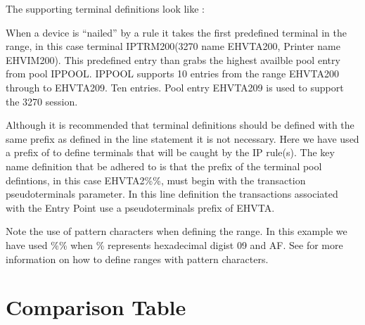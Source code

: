 \documentclass[letterpaper,10pt,english]{sphinxmanual}
\begin{document}
\sphinxAtStartPar
The supporting terminal definitions look like :\sphinxhyphen{}

\sphinxAtStartPar
{}

\sphinxAtStartPar
When a device is “nailed” by a rule it takes the first predefined terminal in the range, in this case terminal IPTRM200(3270 name EHVTA200, Printer name EHVIM200). This pre\sphinxhyphen{}defined entry than grabs the highest availble pool entry from pool IPPOOL. IPPOOL supports 10 entries from the range EHVTA200 through to EHVTA209. Ten entries. Pool entry EHVTA209 is used to support the 3270 session.

\sphinxAtStartPar
Although it is recommended that terminal definitions should be defined with the same prefix as defined in the line statement it is not necessary. Here we have used a prefix of  to define terminals that will be caught by the IP rule(s). The key name definition that  be adhered to is that the prefix of the terminal pool defintions, in this case EHVTA2\%\%, must begin with the transaction pseudo\sphinxhyphen{}terminals parameter. In this line definition the transactions associated with the Entry Point use a pseudo\sphinxhyphen{}terminals prefix of EHVTA.

\sphinxAtStartPar
Note the use of pattern characters when defining the range. In this example we have used \%\% when \% represents hexadecimal digist 0\sphinxhyphen{}9 and A\sphinxhyphen{}F. See {\hyperref[\detokenize{connectivity_guide:v461cn-patterncharacters}]{}} for more information on how to define ranges with pattern characters.

\sphinxAtStartPar
{}

\newpage

\ignorespaces 

\section{Comparison Table}
\label{\detokenize{connectivity_guide:comparison-table}}\label{\detokenize{connectivity_guide:index-155}}
\end{document}
